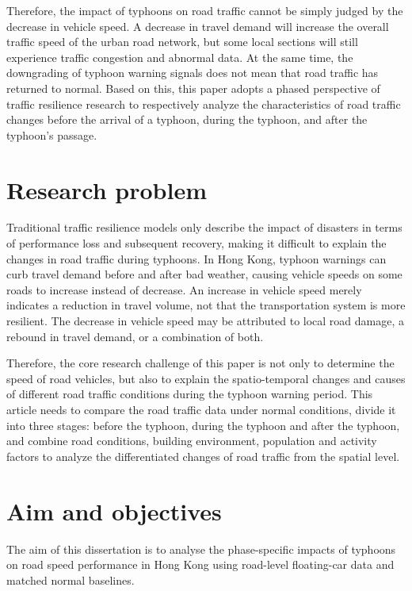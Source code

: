 \documentclass[12pt,a4paper]{report}
\begin{document}
Therefore, the impact of typhoons on road traffic cannot be simply judged by the decrease in vehicle speed. A decrease in travel demand will increase the overall traffic speed of the urban road network, but some local sections will still experience traffic congestion and abnormal data. At the same time, the downgrading of typhoon warning signals does not mean that road traffic has returned to normal. Based on this, this paper adopts a phased perspective of traffic resilience research to respectively analyze the characteristics of road traffic changes before the arrival of a typhoon, during the typhoon, and after the typhoon's passage.

\section{Research problem}
Traditional traffic resilience models only describe the impact of disasters in terms of performance loss and subsequent recovery, making it difficult to explain the changes in road traffic during typhoons. In Hong Kong, typhoon warnings can curb travel demand before and after bad weather, causing vehicle speeds on some roads to increase instead of decrease. An increase in vehicle speed merely indicates a reduction in travel volume, not that the transportation system is more resilient. The decrease in vehicle speed may be attributed to local road damage, a rebound in travel demand, or a combination of both.

Therefore, the core research challenge of this paper is not only to determine the speed of road vehicles, but also to explain the spatio-temporal changes and causes of different road traffic conditions during the typhoon warning period. This article needs to compare the road traffic data under normal conditions, divide it into three stages: before the typhoon, during the typhoon and after the typhoon, and combine road conditions, building environment, population and activity factors to analyze the differentiated changes of road traffic from the spatial level.

\section{Aim and objectives}
The aim of this dissertation is to analyse the phase-specific impacts of typhoons on road speed performance in Hong Kong using road-level floating-car data and matched normal baselines.
\end{document}
